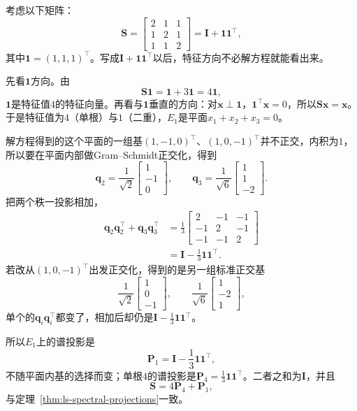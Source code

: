 \begin{example}[重根空间的两组基]
\label{ex:ls-repeated-eigenspace-projection}
考虑以下矩阵：
\[
 \bm S=\begin{bmatrix}2&1&1\\1&2&1\\1&1&2\end{bmatrix}=\bm I+\bm 1\bm 1^\top ,
\]
其中$\bm 1=(1,1,1)^\top$。写成$\bm I+\bm 1\bm 1^\top$以后，特征方向不必解方程就能看出来。

先看$\bm 1$方向。由
\[
 \bm S\bm 1=\bm 1+3\bm 1=4\bm 1 ,
\]
$\bm 1$是特征值$4$的特征向量。再看与$\bm 1$垂直的方向：对$\bm x\perp\bm 1$，$\bm 1^\top\bm x=0$，所以$\bm S\bm x=\bm x$。于是特征值为$4$（单根）与$1$（二重），$E_1$是平面$x_1+x_2+x_3=0$。

解方程得到的这个平面的一组基$(1,-1,0)^\top$、$(1,0,-1)^\top$并不正交，内积为$1$，所以要在平面内部做Gram--Schmidt正交化，得到
\[
 \bm q_2=\frac1{\sqrt2}\begin{bmatrix}1\\-1\\0\end{bmatrix},\qquad
 \bm q_3=\frac1{\sqrt6}\begin{bmatrix}1\\1\\-2\end{bmatrix}.
\]
把两个秩一投影相加，
\[
 \begin{aligned}
 \bm q_2\bm q_2^\top+\bm q_3\bm q_3^\top
 &=\frac13\begin{bmatrix}2&-1&-1\\-1&2&-1\\-1&-1&2\end{bmatrix}\\
 &=\bm I-\frac13\bm 1\bm 1^\top .
 \end{aligned}
\]
若改从$(1,0,-1)^\top$出发正交化，得到的是另一组标准正交基
\[
 \frac1{\sqrt2}\begin{bmatrix}1\\0\\-1\end{bmatrix},\qquad \frac1{\sqrt6}\begin{bmatrix}1\\-2\\1\end{bmatrix},
\]
单个的$\bm q_i\bm q_i^\top$都变了，相加后却仍是$\bm I-\frac13\bm 1\bm 1^\top$。

所以$E_1$上的谱投影是
\[
 \bm P_1=\bm I-\frac13\bm 1\bm 1^\top ,
\]
不随平面内基的选择而变；单根$4$的谱投影是$\bm P_4=\frac13\bm 1\bm 1^\top$。二者之和为$\bm I$，并且
\[
 \bm S=4\bm P_4+\bm P_1 ,
\]
与定理~\ref{thm:ls-spectral-projections}一致。
\end{example}

